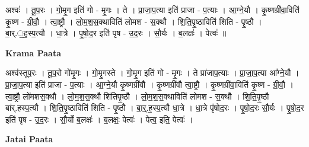 \documentclass[17pt]{extarticle}
\begin{document}
अश्वः॑ । तू॒प॒रः । गो॒मृ॒ग इति॑ गो - मृ॒गः । ते । प्रा॒जा॒प॒त्या इति॑ प्राजा - प॒त्याः । आ॒ग्ने॒यौ । कृ॒ष्णग्री॑वा॒विति॑ कृ॒ष्ण - ग्री॒वौ॒ । त्वा॒ष्ट्रौ । लो॒म॒श॒स॒क्थाविति॑ लोमश - स॒क्थौ । शि॒ति॒पृ॒ष्ठाविति॑ शिति - पृ॒ष्ठौ । बा॒र्.॒ह॒स्प॒त्यौ । धा॒त्रे । पृ॒षो॒द॒र इति॑ पृष - उ॒द॒रः । सौ॒र्यः । ब॒लक्षः॑ । पेत्वः॑ ॥  \newline


\textbf{Krama Paata} \newline

अश्व॑स्तूप॒रः । तू॒प॒रो गो॑मृ॒गः । गो॒मृ॒गस्ते । गो॒मृ॒ग इति॑ गो - मृ॒गः । ते प्रा॑जाप॒त्याः । प्रा॒जा॒प॒त्या आ᳚ग्ने॒यौ । प्रा॒जा॒प॒त्या इति॑ प्राजा - प॒त्याः । आ॒ग्ने॒यौ कृ॒ष्णग्री॑वौ । कृ॒ष्णग्री॑वौ त्वा॒ष्ट्रौ । कृ॒ष्णग्री॑वा॒विति॑ कृ॒ष्ण - ग्री॒वौ॒ । त्वा॒ष्ट्रौ लो॑मशस॒क्थौ । लो॒म॒श॒स॒क्थौ शि॑तिपृ॒ष्ठौ । लो॒म॒श॒स॒क्थाविति॑ लोमश - स॒क्थौ । शि॒ति॒पृ॒ष्ठौ बा॑र्.हस्प॒त्यौ । शि॒ति॒पृ॒ष्ठाविति॑ शिति - पृ॒ष्ठौ । बा॒र्॒.ह॒स्प॒त्यौ धा॒त्रे । धा॒त्रे पृ॑षोद॒रः । पृ॒षो॒द॒रः सौ॒र्यः । पृ॒षो॒द॒र इति॑ पृष - उ॒द॒रः । सौ॒र्यो ब॒लक्षः॑ । ब॒लक्षः॒ पेत्वः॑ । पेत्व॒ इति॒ पेत्वः॑ । \newline

\textbf{Jatai Paata} \newline
\end{document}
